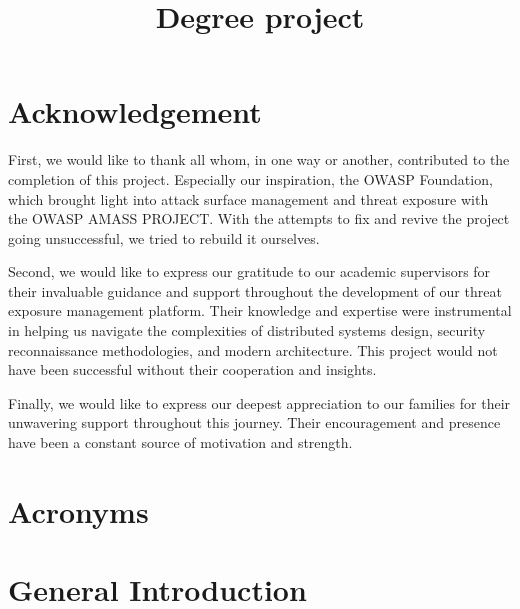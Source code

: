 \documentclass[a4paper,12pt]{report}
\title{Degree project}
\begin{document}
\newpage
\chapter*{Acknowledgement}

First, we would like to thank all whom, in one way or another, contributed to the completion
of this project. Especially our inspiration, the OWASP Foundation, which brought light into attack surface
management and threat exposure with the OWASP AMASS PROJECT. With the attempts to fix and
revive the project going unsuccessful, we tried to rebuild it ourselves.\hfill\break

Second, we would like to express our gratitude to our academic supervisors for their invaluable
guidance and support throughout the development of our threat exposure management platform.
Their knowledge and expertise were instrumental in helping us navigate the complexities of
distributed systems design, security reconnaissance methodologies, and modern architecture.
This project would not have been successful without their cooperation and insights.\hfill\break

Finally, we would like to express our deepest appreciation to our families for their unwavering
support throughout this journey. Their encouragement and presence have been a constant
source of motivation and strength.
\hfill\break

\newpage
\chapter*{Acronyms}


\newpage



\tableofcontents
\clearpage
\thispagestyle{plain}


\newpage
\listoffigures
\newpage
\listoftables

\newpage
{}
\chapter*{General Introduction}
\end{document}
